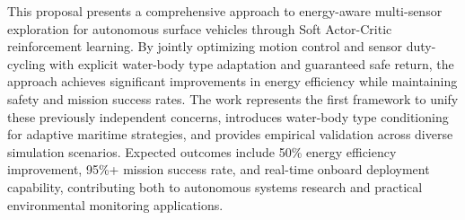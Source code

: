 This proposal presents a comprehensive approach to energy-aware multi-sensor exploration for autonomous surface vehicles through Soft Actor-Critic reinforcement learning. By jointly optimizing motion control and sensor duty-cycling with explicit water-body type adaptation and guaranteed safe return, the approach achieves significant improvements in energy efficiency while maintaining safety and mission success rates. The work represents the first framework to unify these previously independent concerns, introduces water-body type conditioning for adaptive maritime strategies, and provides empirical validation across diverse simulation scenarios. Expected outcomes include 50\% energy efficiency improvement, 95\%+ mission success rate, and real-time onboard deployment capability, contributing both to autonomous systems research and practical environmental monitoring applications.
